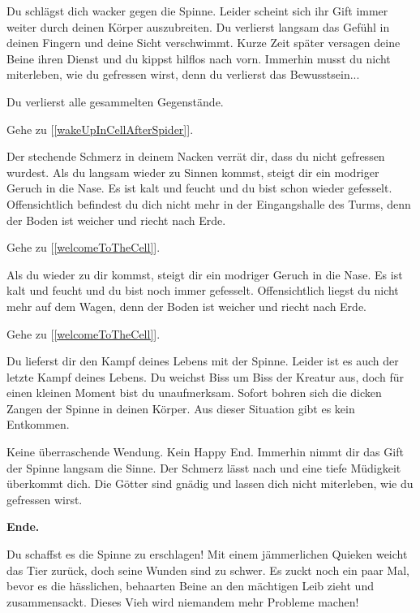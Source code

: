 
Du schlägst dich wacker gegen die Spinne. Leider scheint sich ihr Gift immer weiter durch deinen Körper auszubreiten. Du verlierst langsam das Gefühl in deinen Fingern und deine Sicht verschwimmt.
Kurze Zeit später versagen deine Beine ihren Dienst und du kippst hilflos nach vorn. Immerhin musst du nicht miterleben, wie du gefressen wirst, denn du verlierst das Bewusstsein...

Du verlierst alle gesammelten Gegenstände.

Gehe zu [\ref{wakeUpInCellAfterSpider}].


Der stechende Schmerz in deinem Nacken verrät dir, dass du nicht gefressen wurdest. Als du langsam wieder zu Sinnen kommst, steigt dir ein modriger Geruch in die Nase. Es ist kalt und feucht und du bist schon wieder gefesselt. Offensichtlich befindest du dich nicht mehr in der Eingangshalle des Turms, denn der Boden ist weicher und riecht nach Erde.

Gehe zu [\ref{welcomeToTheCell}].


Als du wieder zu dir kommst, steigt dir ein modriger Geruch in die Nase. Es ist kalt und feucht und du bist noch immer gefesselt. Offensichtlich liegst du nicht mehr auf dem Wagen, denn der Boden ist weicher und riecht nach Erde.

Gehe zu [\ref{welcomeToTheCell}].


Du lieferst dir den Kampf deines Lebens mit der Spinne. Leider ist es auch der letzte Kampf deines Lebens. Du weichst Biss um Biss der Kreatur aus, doch für einen kleinen Moment bist du unaufmerksam. Sofort bohren sich die dicken Zangen der Spinne in deinen Körper. Aus dieser Situation gibt es kein Entkommen.

Keine überraschende Wendung. Kein Happy End. Immerhin nimmt dir das Gift der Spinne langsam die Sinne. Der Schmerz lässt nach und eine tiefe Müdigkeit überkommt dich. Die Götter sind gnädig und lassen dich nicht miterleben, wie du gefressen wirst.

\textbf{Ende.}


Du schaffst es die Spinne zu erschlagen! Mit einem jämmerlichen Quieken weicht das Tier zurück, doch seine Wunden sind zu schwer. Es zuckt noch ein paar Mal, bevor es die hässlichen, behaarten Beine an den mächtigen Leib zieht und zusammensackt. Dieses Vieh wird niemandem mehr Probleme machen!

